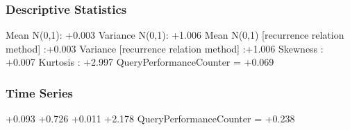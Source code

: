 \documentclass[9pt]{article}
\theoremstyle{plain}
\theoremstyle{definition}
\theoremstyle{remark}
\numberwithin{equation}{section}
\begin{document}
\subsubsection{Descriptive Statistics}
Mean N(0,1): +0.003
Variance N(0,1): +1.006
Mean N(0,1) [recurrence relation method] :+0.003
Variance [recurrence relation method] :+1.006
Skewness : +0.007
Kurtosis : +2.997
QueryPerformanceCounter  =  +0.069
\subsubsection{Time Series }
+0.093
+0.726
+0.011
+2.178
QueryPerformanceCounter  =  +0.238
\end{document}
